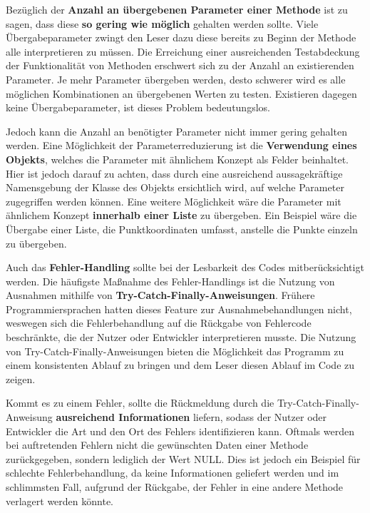\documentclass[utf8,biblatex]{lni}
\begin{document}
Bezüglich der \textbf{Anzahl an übergebenen Parameter einer Methode} ist zu sagen, dass diese \textbf{so gering wie möglich} gehalten werden sollte. Viele Übergabeparameter zwingt den Leser dazu diese bereits zu Beginn der Methode alle interpretieren zu müssen. Die Erreichung einer ausreichenden Testabdeckung der Funktionalität von Methoden erschwert sich zu der Anzahl an existierenden Parameter. Je mehr Parameter übergeben werden, desto schwerer wird es alle möglichen Kombinationen an übergebenen Werten zu testen. Existieren dagegen keine Übergabeparameter, ist dieses Problem bedeutungslos.

Jedoch kann die Anzahl an benötigter Parameter nicht immer gering gehalten werden. Eine Möglichkeit der Parameterreduzierung ist die \textbf{Verwendung eines Objekts}, welches die Parameter mit ähnlichem Konzept als Felder beinhaltet. Hier ist jedoch darauf zu achten, dass durch eine ausreichend aussagekräftige Namensgebung der Klasse des Objekts ersichtlich wird, auf welche Parameter zugegriffen werden können. Eine weitere Möglichkeit wäre die Parameter mit ähnlichem Konzept \textbf{innerhalb einer Liste} zu übergeben. Ein Beispiel wäre die Übergabe einer Liste, die Punktkoordinaten umfasst, anstelle die Punkte einzeln zu übergeben.


Auch das \textbf{Fehler-Handling} sollte bei der Lesbarkeit des Codes mitberücksichtigt werden. Die häufigste Maßnahme des Fehler-Handlings ist die Nutzung von Ausnahmen mithilfe von \textbf{Try-Catch-Finally-Anweisungen}. Frühere Programmiersprachen hatten dieses Feature zur Ausnahmebehandlungen nicht, weswegen sich die Fehlerbehandlung auf die Rückgabe von Fehlercode beschränkte, die der Nutzer oder Entwickler interpretieren musste. Die Nutzung von Try-Catch-Finally-Anweisungen bieten die Möglichkeit das Programm zu einem konsistenten Ablauf zu bringen und dem Leser diesen Ablauf im Code zu zeigen.

Kommt es zu einem Fehler, sollte die Rückmeldung durch die Try-Catch-Finally-Anweisung \textbf{ausreichend Informationen} liefern, sodass der Nutzer oder Entwickler die Art und den Ort des Fehlers identifizieren kann. Oftmals werden bei auftretenden Fehlern nicht die gewünschten Daten einer Methode zurückgegeben, sondern lediglich der Wert NULL. Dies ist jedoch ein Beispiel für schlechte Fehlerbehandlung, da keine Informationen geliefert werden und im schlimmsten Fall, aufgrund der Rückgabe, der Fehler in eine andere Methode verlagert werden könnte.
\end{document}
